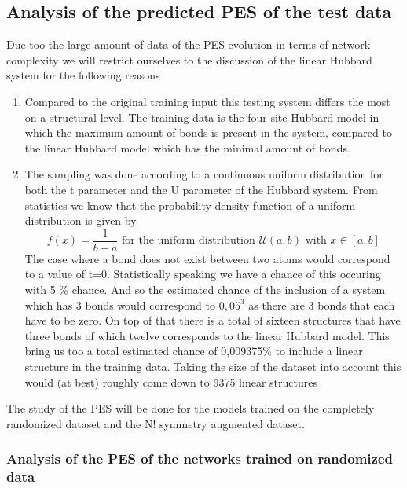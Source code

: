 \documentclass[12pt]{article}
\begin{document}
\subsection{Analysis of the predicted PES of the test data}
Due too the large amount of data of the PES evolution in terms of network complexity we will restrict ourselves to the discussion of the linear Hubbard system for the following reasons
\begin{enumerate}
	\item Compared to the original training input this testing system differs the most on a structural level. The training data is the four site Hubbard model in which the maximum amount of bonds is present in the system, compared to the linear Hubbard model which has the minimal amount of bonds.
	\item The sampling was done according to a continuous uniform distribution for both the t parameter and the U parameter of the Hubbard system. From statistics we know that the probability density function of a uniform distribution is given by
	\begin{equation*}
	f(x) = \frac{1}{b-a} \text{ for the uniform distribution } \mathcal{U}(a,b) \text{ with } x \in \left[ a, b \right]
	\end{equation*}
	The case where a bond does not exist between two atoms would correspond to a value of t=0. Statistically speaking we have a chance of this occuring with 5 $\%$ chance. And so the estimated chance of the inclusion of a system which has 3 bonds would correspond to $0,05^3$ as there are 3 bonds that each have to be zero. On top of that there is a total of sixteen structures that have three bonds of which twelve corresponds to the linear Hubbard model. This bring us too a total estimated chance of 0,009375$\%$ to include a linear structure in the training data. Taking the size of the dataset into account this would (at best) roughly come down to 9375 linear structures
\end{enumerate}
The study of the PES will be done for the models trained on the completely randomized dataset and the N! symmetry augmented dataset.

\subsubsection{Analysis of the PES of the networks trained on randomized data}
\end{document}
